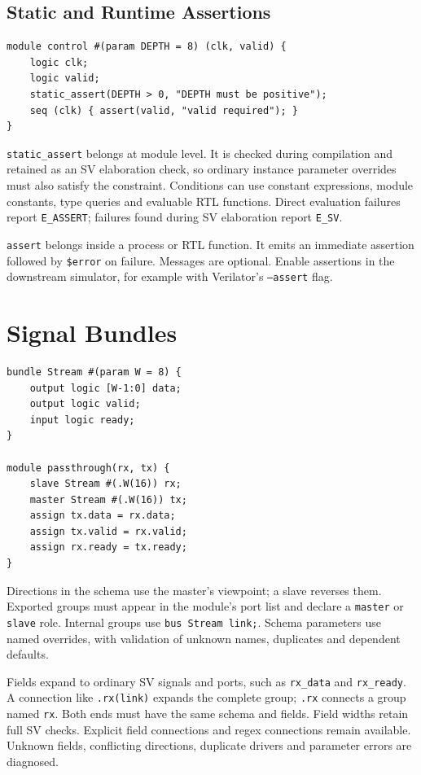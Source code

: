 \documentclass[lang=en,11pt]{elegantbook}
\newcommand{\code}[1]{\texttt{#1}}
\begin{document}
\section{Static and Runtime Assertions}

\begin{lstlisting}[language=Slip]
module control #(param DEPTH = 8) (clk, valid) {
    logic clk;
    logic valid;
    static_assert(DEPTH > 0, "DEPTH must be positive");
    seq (clk) { assert(valid, "valid required"); }
}
\end{lstlisting}

\code{static\_assert} belongs at module level. It is checked during compilation
and retained as an SV elaboration check, so ordinary instance parameter overrides
must also satisfy the constraint. Conditions can use constant expressions,
module constants, type queries and evaluable RTL functions. Direct evaluation
failures report \code{E\_ASSERT}; failures found during SV elaboration report
\code{E\_SV}.

\code{assert} belongs inside a process or RTL function. It emits an immediate
assertion followed by \code{\$error} on failure. Messages are optional.
Enable assertions in the downstream simulator, for example with Verilator's
\code{--assert} flag.

\chapter{Signal Bundles}
\label{ch:bundles}

\begin{lstlisting}[language=Slip]
bundle Stream #(param W = 8) {
    output logic [W-1:0] data;
    output logic valid;
    input logic ready;
}

module passthrough(rx, tx) {
    slave Stream #(.W(16)) rx;
    master Stream #(.W(16)) tx;
    assign tx.data = rx.data;
    assign tx.valid = rx.valid;
    assign rx.ready = tx.ready;
}
\end{lstlisting}

Directions in the schema use the master's viewpoint; a slave reverses them.
Exported groups must appear in the module's port list and declare a
\code{master} or \code{slave} role. Internal groups use \code{bus Stream link;}.
Schema parameters use named overrides, with validation of unknown names,
duplicates and dependent defaults.

Fields expand to ordinary SV signals and ports, such as \code{rx\_data} and
\code{rx\_ready}. A connection like \code{.rx(link)} expands the complete group;
\code{.rx} connects a group named \code{rx}. Both ends must have the same schema
and fields. Field widths retain full SV checks. Explicit field connections and
regex connections remain available. Unknown fields, conflicting directions,
duplicate drivers and parameter errors are diagnosed.
\end{document}
